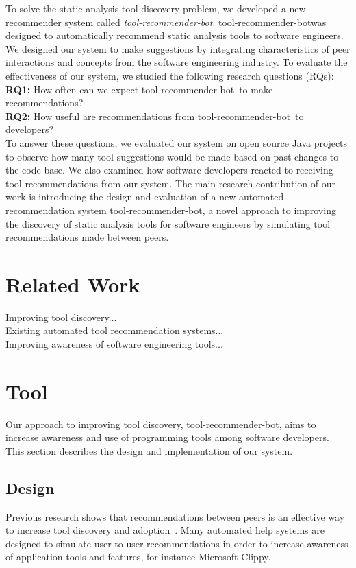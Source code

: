 \documentclass[conference]{IEEEtran}
\newcommand{\tool}{tool-recommender-bot}
\begin{document}
To solve the static analysis tool discovery problem, we developed a new recommender system called \textit{\tool}. \tool was designed to automatically recommend static analysis tools to software engineers. We designed our system to make suggestions by integrating characteristics of peer interactions and concepts from the software engineering industry. To evaluate the effectiveness of our system, we studied the following research questions (RQs): \\

\noindent
\textbf{RQ1:} How often can we expect \tool~to make recommendations?  \\
\textbf{RQ2:} How useful are recommendations from \tool~to developers?  \\

To answer these questions, we evaluated our system on open source Java projects to observe how many tool suggestions would be made based on past changes to the code base. We also examined how software developers reacted to receiving tool recommendations from our system. The main research contribution of our work is introducing the design and evaluation of a new automated recommendation system \tool, a novel approach to improving the discovery of static analysis tools for software engineers by simulating tool recommendations made between peers.

\section{Related Work}

Improving tool discovery...\\

Existing automated tool recommendation systems...\\

Improving awareness of software engineering tools...\\

\section{Tool}
Our approach to improving tool discovery, \tool, aims to increase awareness and use of programming tools among software developers. This section describes the design and implementation of our system.

\subsection{Design}
Previous research shows that recommendations between peers is an effective way to increase tool discovery and adoption~\cite{Murphy-HillPeerInteraction}. Many automated help systems are designed to simulate user-to-user recommendations in order to increase awareness of application tools and features, for instance Microsoft Clippy\cite{Clippy}. 
\end{document}
